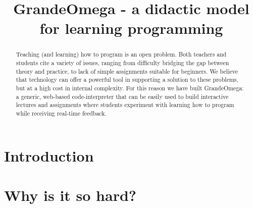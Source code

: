 \documentclass{article}
\title{GrandeOmega - a didactic model for learning programming}
\author{ }
\date { }
\begin{document}
\maketitle

\begin{abstract}
	Teaching (and learning) how to program is an open problem. Both teachers and students cite a variety of issues, ranging from difficulty bridging the gap between theory and practice, to lack of simple assignments suitable for beginners.
	We believe that technology can offer a powerful tool in supporting a solution to these problems, but at a high cost in internal complexity. For this reason we have built GrandeOmega: a generic, web-based code-interpreter that can be easily used to build interactive lectures and assignments where students experiment with learning how to program while receiving real-time feedback.
\end{abstract}

\section{Introduction}
\label{sec:introduction}


\section{Why is it so hard?}
\label{sec:problem}

\end{document}
